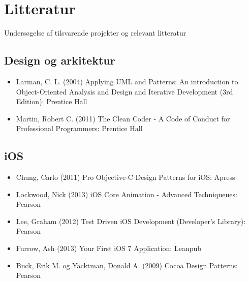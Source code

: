 \chapter{Litteratur}
Undersøgelse af tilsvarende projekter og relevant litteratur

\section{Design og arkitektur}
\begin{itemize}
\item Larman, C. L. (2004) Applying UML and Patterns: An introduction to Object-Oriented Analysis and Design and Iterative Development (3rd Edition): Prentice Hall

\item Martin, Robert C. (2011) The Clean Coder - A Code of Conduct for Professional Programmers: Prentice Hall
\end{itemize}
\section{iOS}
\begin{itemize}
\item Chung, Carlo (2011) Pro Objective-C Design Patterns for iOS: Apress

\item Lockwood, Nick (2013) iOS Core Animation - Advanced Techniqueues: Pearson

\item Lee, Graham (2012) Test Driven iOS Development (Developer’s Library): Pearson

\item Furrow, Ash (2013) Your First iOS 7 Application: Leanpub

\item Buck, Erik M. og Yacktman, Donald A. (2009) Cocoa Design Patterns: Pearson
\end{itemize}
